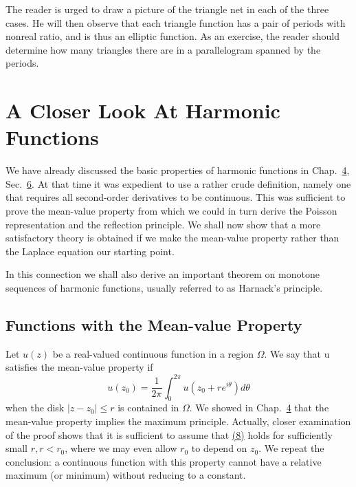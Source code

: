 The reader is urged to draw a picture of the triangle net in each of the three cases. He will then observe that each triangle function has a pair of periods with nonreal ratio, and is thus an elliptic function. As an exercise, the reader should determine how many triangles there are in a parallelogram spanned by the periods.

\setcounter{section}{2}\section{A Closer Look At Harmonic Functions}\label{sec:6.3}
We have already discussed the basic properties of harmonic functions in Chap.~\hyperref[chap:4]{4}, Sec.~\hyperref[sec:4.6]{6}. At that time it was expedient to use a rather crude
definition, namely one that requires all second-order derivatives to be continuous. This was sufficient to prove the mean-value property from which we could in turn derive the Poisson representation and the reflection principle. We shall now show that a more satisfactory theory is obtained if we make the mean-value property rather than the Laplace equation our starting point.

In this connection we shall also derive an important theorem on monotone sequences of harmonic functions, usually referred to as Harnack's principle.

\setcounter{section}{3}\setcounter{subsection}{0}\subsection{Functions with the Mean-value Property}\label{sec:6.3.1}
Let $u(z)$ be a real-valued continuous function in a region $\Omega$. We say that u satisfies the mean-value property if
\begin{equation*}
u (z _ {0}) = \frac {1}{2 \pi} \int_ {0} ^ {2 \pi} u (z _ {0} + r e ^ {i \theta}) d \theta\tag{8}\label{eq:6.8}
\end{equation*}
when the disk $|z - z_{0}| \leq r$ is contained in $\Omega$. We showed in Chap.~\hyperref[chap:4]{4} that the mean-value property implies the maximum principle. Actually, closer examination of the proof shows that it is sufficient to assume that \hyperref[eq:6.8]{(8)} holds for sufficiently small $r, r < r_{0}$, where we may even allow $r_{0}$ to depend on $z_{0}$. We repeat the conclusion: a continuous function with this property cannot have a relative maximum (or minimum) without reducing to a constant.


